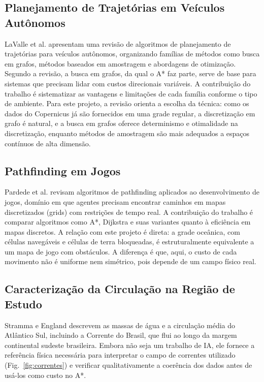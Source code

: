 \documentclass[conference]{IEEEtran}
\begin{document}
\subsection{Planejamento de Trajetórias em Veículos Autônomos}
LaValle et al. \cite{lavalle} apresentam uma revisão de algoritmos de planejamento de trajetórias para veículos autônomos, organizando famílias de métodos como busca em grafos, métodos baseados em amostragem e abordagens de otimização. Segundo a revisão, a busca em grafos, da qual o A* faz parte, serve de base para sistemas que precisam lidar com custos direcionais variáveis. A contribuição do trabalho é sistematizar as vantagens e limitações de cada família conforme o tipo de ambiente. Para este projeto, a revisão orienta a escolha da técnica: como os dados do Copernicus já são fornecidos em uma grade regular, a discretização em grafo é natural, e a busca em grafos oferece determinismo e otimalidade na discretização, enquanto métodos de amostragem são mais adequados a espaços contínuos de alta dimensão.

\subsection{Pathfinding em Jogos}
Pardede et al. \cite{pardede} revisam algoritmos de pathfinding aplicados ao desenvolvimento de jogos, domínio em que agentes precisam encontrar caminhos em mapas discretizados (grids) com restrições de tempo real. A contribuição do trabalho é comparar algoritmos como A*, Dijkstra e suas variantes quanto à eficiência em mapas discretos. A relação com este projeto é direta: a grade oceânica, com células navegáveis e células de terra bloqueadas, é estruturalmente equivalente a um mapa de jogo com obstáculos. A diferença é que, aqui, o custo de cada movimento não é uniforme nem simétrico, pois depende de um campo físico real.

\subsection{Caracterização da Circulação na Região de Estudo}
Stramma e England \cite{stramma} descrevem as massas de água e a circulação média do Atlântico Sul, incluindo a Corrente do Brasil, que flui ao longo da margem continental sudeste brasileira. Embora não seja um trabalho de IA, ele fornece a referência física necessária para interpretar o campo de correntes utilizado (Fig.~\ref{fig:correntes}) e verificar qualitativamente a coerência dos dados antes de usá-los como custo no A*.
\end{document}
